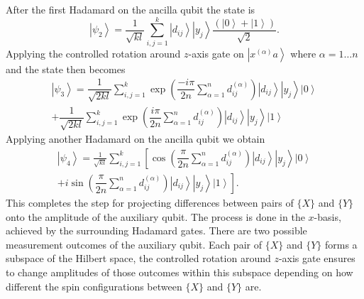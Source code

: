 \documentclass[pra,showkeys,twocolumn,showpacs]{revtex4-1}
\begin{document}
After the first Hadamard on the ancilla qubit the state is
%
\begin{equation}
    \left| \psi_2 \right\rangle = 
    \frac{1}{\sqrt{kl}}\sum\limits_{i, j=1}^{k} 
    \left| d_{ij} \right\rangle 
    \left| y_j \right\rangle
    \dfrac{(\left| 0 \right\rangle + \left| 1 \right\rangle)}{\sqrt{2}}  .
\end{equation}
%
Applying the controlled rotation around $z$-axis gate on $\left| x^{(\alpha)} a \right\rangle$ where $\alpha = 1\dots n$ and the state then becomes
%
\begin{multline}
    \left| \psi_3 \right\rangle  
	= \dfrac{1}{\sqrt{2kl}} \sum\limits_{i, j=1}^{k} 
		\exp\left(
		    \dfrac{-i \pi}{2n}
		    \sum\limits_{\alpha=1}^n d^{(\alpha)}_{ij}
		\right)
		\left| d_{ij} \right\rangle 
		\left| y_j \right\rangle 
		\left| 0 \right\rangle \\
    + \dfrac{1}{\sqrt{2kl}} \sum\limits_{i, j=1}^{k}
		\exp\left(
		    \dfrac{i \pi}{2n}
		    \sum\limits_{\alpha=1}^n d^{(\alpha)}_{ij} 
		\right)
		\left| d_{ij} \right\rangle  
		\left| y_j \right\rangle 
		\left| 1 \right\rangle
\end{multline}
%
Applying another Hadamard on the ancilla qubit we obtain
%
\begin{multline}
    \left| \psi_4 \right\rangle = 
    \frac{1}{\sqrt{kl}}\sum\limits_{i, j=1}^{k} 
        \left[ 
			\cos\left(
			    \dfrac{\pi}{2n}
			    \sum\limits_{\alpha=1}^n d^{(\alpha)}_{ij}
			\right)
			\left| d_{ij} \right\rangle 
			\left| y_j \right\rangle 
			\left| 0 \right\rangle\right.
			\\+ 
			\left. i \sin\left(
			    \dfrac{\pi}{2n} 
			    \sum\limits_{\alpha=1}^n d^{(\alpha)}_{ij} 
			\right)
			\left| d_{ij} \right\rangle 
			\left| y_j \right\rangle 
			\left| 1 \right\rangle
		\right] .
\end{multline}
%
This completes the step for projecting differences between pairs of $\{X\}$ and $\{Y\}$ onto the amplitude of the auxiliary qubit. 
The process is done in the $x$-basis, achieved by the surrounding Hadamard gates. 
There are two possible measurement outcomes of the auxiliary qubit.  
Each pair of $\{X\}$ and $\{Y\}$ forms a subspace of the Hilbert space, 
the controlled rotation around $z$-axis gate ensures to change amplitudes of those outcomes within this subspace depending on how different the spin configurations between $\{X\}$ and $\{Y\}$ are.
\end{document}
